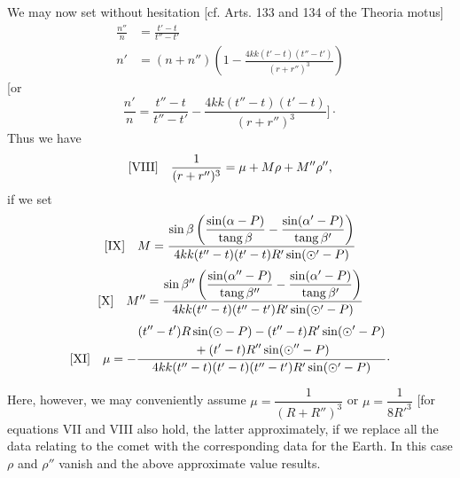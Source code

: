 We may now set without hesitation [cf. Arts. 133 and 134 of the Theoria motus]
\[
\begin{aligned}
\frac{n''}{n}&=\frac{t'-t}{t''-t'}\\
n'&=(n+n'')\left(1-\frac{4kk(t'-t)(t''-t')}{(r+r'')^3}\right)
\end{aligned}
\]
[or
\[
\frac{n'}{n}=\frac{t''-t}{t''-t'}-\frac{4kk(t''-t)(t'-t)}{(r+r'')^3}\Biggr]\mathpunct{\cdot}
\]
Thus we have
\[
\begin{array}{l@{\quad}l}
[\mathrm{VIII}]&\displaystyle\frac{1}{(r+r'')^3}=\mu+M\rho+M''\rho'',
\end{array}
\]
if we set
\[
\begin{array}{l@{\quad}l}
[\mathrm{IX}]&\displaystyle M=\frac{\sin\beta\left(\dfrac{\sin(\alpha-P)}{\operatorname{tang}\beta}-\dfrac{\sin(\alpha'-P)}{\operatorname{tang}\beta'}\right)}{4kk(t''-t)(t'-t)R'\sin(\odot'-P)}
\end{array}
\]
\[
\begin{array}{l@{\quad}l}
[\mathrm{X}]&\displaystyle M''=\frac{\sin\beta''\left(\dfrac{\sin(\alpha''-P)}{\operatorname{tang}\beta''}-\dfrac{\sin(\alpha'-P)}{\operatorname{tang}\beta'}\right)}{4kk(t''-t)(t''-t')R'\sin(\odot'-P)}
\end{array}
\]
\[
\begin{array}{l@{\quad}l}
[\mathrm{XI}]&\displaystyle\mu=-\frac{\begin{gathered}(t''-t')R\sin(\odot-P)-(t''-t)R'\sin(\odot'-P)\\{}+(t'-t)R''\sin(\odot''-P)\end{gathered}}{4kk(t''-t)(t'-t)(t''-t')R'\sin(\odot'-P)}\mathpunct{\cdot}
\end{array}
\]

Here, however, we may conveniently assume \(\mu=\dfrac{1}{(R+R'')^3}\) or \(\mu=\dfrac{1}{8R'^3}\) [for equations VII and VIII also hold, the latter approximately, if we replace all the data relating to the comet with the corresponding data for the Earth. In this case \(\rho\) and \(\rho''\) vanish and the above approximate value results.

